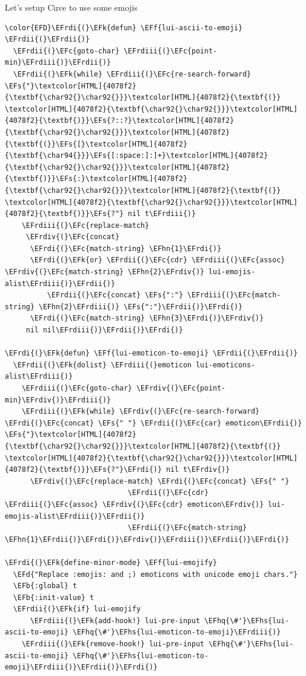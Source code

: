 \documentclass{scrartcl}
\newcommand{\EFk}[1]{\textcolor{EFk}{#1}} %
\newcommand{\EFd}[1]{\textcolor{EFd}{\textit{#1}}} %
\newcommand{\EFs}[1]{\textcolor{EFs}{#1}} %
\newcommand{\EFb}[1]{\textcolor{EFb}{#1}} %
\newcommand{\EFc}[1]{\textcolor{EFc}{#1}} %
\newcommand{\EFf}[1]{\textcolor{EFf}{#1}} %
\newcommand{\EFhn}[1]{\textcolor{EFhn}{\textbf{#1}}} %
\newcommand{\EFhq}[1]{\textcolor{EFhq}{#1}} %
\newcommand{\EFhs}[1]{\textcolor{EFhs}{#1}} %
\newcommand{\EFrdi}[1]{\textcolor{EFrdi}{#1}} %
\newcommand{\EFrdii}[1]{\textcolor{EFrdii}{#1}} %
\newcommand{\EFrdiii}[1]{\textcolor{EFrdiii}{#1}} %
\newcommand{\EFrdiv}[1]{\textcolor{EFrdiv}{#1}} %
\begin{document}
Let's setup Circe to use some emojis
\begin{Code}
\begin{Verbatim}[]
\color{EFD}\EFrdi{(}\EFk{defun} \EFf{lui-ascii-to-emoji} \EFrdii{(}\EFrdii{)}
  \EFrdii{(}\EFc{goto-char} \EFrdiii{(}\EFc{point-min}\EFrdiii{)}\EFrdii{)}
  \EFrdii{(}\EFk{while} \EFrdiii{(}\EFc{re-search-forward} \EFs{"}\textcolor[HTML]{4078f2}{\textbf{\char92{}\char92{}}}\textcolor[HTML]{4078f2}{\textbf{(}} \textcolor[HTML]{4078f2}{\textbf{\char92{}\char92{}}}\textcolor[HTML]{4078f2}{\textbf{)}}\EFs{?::?}\textcolor[HTML]{4078f2}{\textbf{\char92{}\char92{}}}\textcolor[HTML]{4078f2}{\textbf{(}}\EFs{[}\textcolor[HTML]{4078f2}{\textbf{\char94{}}}\EFs{[:space:]:]+}\textcolor[HTML]{4078f2}{\textbf{\char92{}\char92{}}}\textcolor[HTML]{4078f2}{\textbf{)}}\EFs{:}\textcolor[HTML]{4078f2}{\textbf{\char92{}\char92{}}}\textcolor[HTML]{4078f2}{\textbf{(}} \textcolor[HTML]{4078f2}{\textbf{\char92{}\char92{}}}\textcolor[HTML]{4078f2}{\textbf{)}}\EFs{?"} nil t\EFrdiii{)}
    \EFrdiii{(}\EFc{replace-match}
     \EFrdiv{(}\EFc{concat}
      \EFrdi{(}\EFc{match-string} \EFhn{1}\EFrdi{)}
      \EFrdi{(}\EFk{or} \EFrdii{(}\EFc{cdr} \EFrdiii{(}\EFc{assoc} \EFrdiv{(}\EFc{match-string} \EFhn{2}\EFrdiv{)} lui-emojis-alist\EFrdiii{)}\EFrdii{)}
          \EFrdii{(}\EFc{concat} \EFs{":"} \EFrdiii{(}\EFc{match-string} \EFhn{2}\EFrdiii{)} \EFs{":"}\EFrdii{)}\EFrdi{)}
      \EFrdi{(}\EFc{match-string} \EFhn{3}\EFrdi{)}\EFrdiv{)}
     nil nil\EFrdiii{)}\EFrdii{)}\EFrdi{)}

\EFrdi{(}\EFk{defun} \EFf{lui-emoticon-to-emoji} \EFrdii{(}\EFrdii{)}
  \EFrdii{(}\EFk{dolist} \EFrdiii{(}emoticon lui-emoticons-alist\EFrdiii{)}
    \EFrdiii{(}\EFc{goto-char} \EFrdiv{(}\EFc{point-min}\EFrdiv{)}\EFrdiii{)}
    \EFrdiii{(}\EFk{while} \EFrdiv{(}\EFc{re-search-forward} \EFrdi{(}\EFc{concat} \EFs{" "} \EFrdii{(}\EFc{car} emoticon\EFrdii{)} \EFs{"}\textcolor[HTML]{4078f2}{\textbf{\char92{}\char92{}}}\textcolor[HTML]{4078f2}{\textbf{(}} \textcolor[HTML]{4078f2}{\textbf{\char92{}\char92{}}}\textcolor[HTML]{4078f2}{\textbf{)}}\EFs{?"}\EFrdi{)} nil t\EFrdiv{)}
      \EFrdiv{(}\EFc{replace-match} \EFrdi{(}\EFc{concat} \EFs{" "}
                             \EFrdii{(}\EFc{cdr} \EFrdiii{(}\EFc{assoc} \EFrdiv{(}\EFc{cdr} emoticon\EFrdiv{)} lui-emojis-alist\EFrdiii{)}\EFrdii{)}
                             \EFrdii{(}\EFc{match-string} \EFhn{1}\EFrdii{)}\EFrdi{)}\EFrdiv{)}\EFrdiii{)}\EFrdii{)}\EFrdi{)}

\EFrdi{(}\EFk{define-minor-mode} \EFf{lui-emojify}
  \EFd{"Replace :emojis: and ;) emoticons with unicode emoji chars."}
  \EFb{:global} t
  \EFb{:init-value} t
  \EFrdii{(}\EFk{if} lui-emojify
      \EFrdiii{(}\EFk{add-hook!} lui-pre-input \EFhq{\#'}\EFhs{lui-ascii-to-emoji} \EFhq{\#'}\EFhs{lui-emoticon-to-emoji}\EFrdiii{)}
    \EFrdiii{(}\EFk{remove-hook!} lui-pre-input \EFhq{\#'}\EFhs{lui-ascii-to-emoji} \EFhq{\#'}\EFhs{lui-emoticon-to-emoji}\EFrdiii{)}\EFrdii{)}\EFrdi{)}
\end{Verbatim}
\end{Code}
\end{document}
